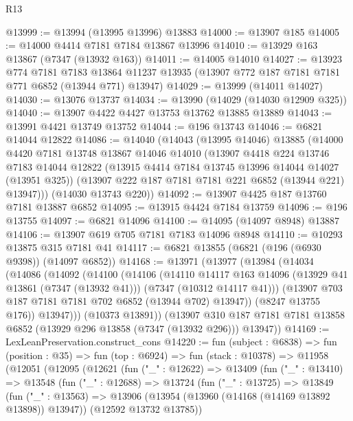 \begin{lexlean}{R13}
\begin{coremodule}
@13999 := @13994 (@13995 @13996) @13883
@14000 := @13907 @185
@14005 := @14000 @4414 @7181 @7184 @13867 @13996
@14010 := @13929 @163 @13867 (@7347 (@13932 @163))
@14011 := @14005 @14010
@14027 := @13923
    @774
    @7181
    @7183
    @13864
    @11237
    @13935
    (@13907 @772 @187 @7181 @7181 @771 @6852 (@13944 @771) @13947)
@14029 := @13999 (@14011 @14027)
@14030 := @13076 @13737
@14034 := @13990 (@14029 (@14030 @12909 @325))
@14040 := @13907 @4422 @4427 @13753 @13762 @13885 @13889
@14043 := @13991 @4421 @13749 @13752
@14044 := @196 @13743
@14046 := @6821 @14044 @12822
@14086 := @14040
    (@14043
      (@13995 @14046)
      @13885
      (@14000
        @4420
        @7181
        @13748
        @13867
        @14046
        @14010
        (@13907
          @4418
          @224
          @13746
          @7183
          @14044
          @12822
          (@13915 @4414 @7184 @13745 @13996 @14044 @14027 (@13951 @325))
          (@13907 @222 @187 @7181 @7181 @221 @6852 (@13944 @221) @13947)))
      (@14030 @13743 @220))
@14092 := @13907 @4425 @187 @13760 @7181 @13887 @6852
@14095 := @13915 @4424 @7184 @13759
@14096 := @196 @13755
@14097 := @6821 @14096
@14100 := @14095 (@14097 @8948) @13887
@14106 := @13907 @619 @705 @7181 @7183 @14096 @8948
@14110 := @10293 @13875 @315 @7181 @41
@14117 := @6821 @13855 (@6821 (@196 (@6930 @9398)) (@14097 @6852))
@14168 := @13971
    (@13977
      (@13984
        (@14034
          (@14086
            (@14092
              (@14100
                (@14106
                  (@14110
                    @14117
                    @163
                    @14096
                    (@13929 @41 @13861 (@7347 (@13932 @41)))
                    (@7347 (@10312 @14117 @41)))
                  (@13907 @703 @187 @7181 @7181 @702 @6852 (@13944 @702) @13947))
                (@8247 @13755 @176))
              @13947)))
        (@10373 @13891))
      (@13907 @310 @187 @7181 @7181 @13858 @6852 (@13929 @296 @13858 (@7347 (@13932 @296))) @13947))
@14169 := LexLeanPreservation.construct_cons
@14220 := fun (subject : @6838) =>
  fun (position : @35) =>
  fun (top : @6924) =>
  fun (stack : @10378) =>
  @11958
    (@12051
      (@12095
        (@12621
          (fun ("_" : @12622) =>
          @13409
            (fun ("_" : @13410) =>
            @13548
              (fun ("_" : @12688) =>
              @13724
                (fun ("_" : @13725) =>
                @13849
                  (fun ("_" : @13563) =>
                  @13906
                    (@13954 (@13960 (@14168 (@14169 @13892 @13898)) @13947))
                    (@12592 @13732 @13785))

\end{coremodule}
\end{lexlean}
